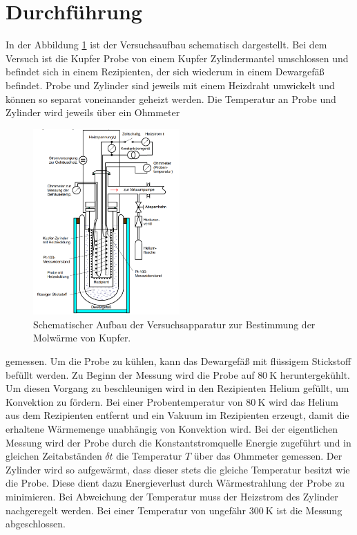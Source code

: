 \newpage
\section{Durchführung}
\label{sec:Durchführung}
In der Abbildung \ref{fig:aufbau} ist der Versuchsaufbau schematisch
dargestellt.
Bei dem Versuch ist die Kupfer Probe von einem Kupfer Zylindermantel
umschlossen und
befindet sich
in einem Rezipienten, der sich wiederum in einem
Dewargefäß befindet. Probe und Zylinder
sind jeweils mit einem Heizdraht umwickelt und können so
separat voneinander geheizt werden.
Die Temperatur an Probe und Zylinder wird jeweils über ein Ohmmeter
\begin{figure}
  \centering
  \includegraphics[width=0.5\textwidth]{Aufbau.PNG}
  \caption{Schematischer Aufbau der Versuchsapparatur zur Bestimmung der Molwärme von Kupfer. \cite{sample}}
  \label{fig:aufbau}
\end{figure}
gemessen.
Um die Probe
zu kühlen, kann das Dewargefäß mit flüssigem Stickstoff
befüllt werden.
Zu Beginn der Messung wird die Probe auf $\SI{80}{\kelvin}$
heruntergekühlt.
Um diesen Vorgang zu beschleunigen wird in den Rezipienten Helium
gefüllt, um Konvektion zu fördern. Bei einer Probentemperatur von $\SI{80}{\kelvin}$ wird das Helium aus dem
Rezipienten entfernt und ein
Vakuum im Rezipienten
erzeugt, damit die erhaltene Wärmemenge unabhängig von Konvektion wird.
Bei der eigentlichen Messung wird der Probe durch die Konstantstromquelle
Energie zugeführt und
in gleichen Zeitabständen $\delta t$
die Temperatur $T$ über das Ohmmeter gemessen.
Der Zylinder wird so aufgewärmt, dass
dieser stets die gleiche Temperatur
besitzt wie die Probe.
Diese dient dazu Energieverlust
durch Wärmestrahlung der Probe zu minimieren.
Bei Abweichung der Temperatur muss der Heizstrom des Zylinder
nachgeregelt werden. Bei einer Temperatur von ungefähr $\SI{300}{\kelvin}$
ist die Messung abgeschlossen.
